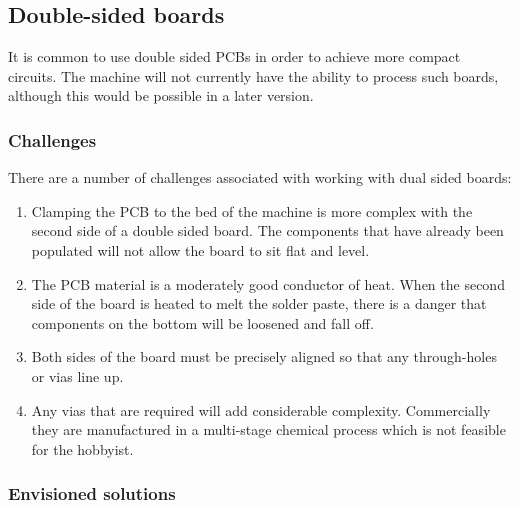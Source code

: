 \subsection{Double-sided boards}
It is common to use double sided PCBs in order to achieve more compact circuits. The machine will not currently have the ability to process such boards, although this would be possible in a later version.

\subsubsection{Challenges}
There are a number of challenges associated with working with dual sided boards:

\begin{enumerate}
	\item	Clamping the PCB to the bed of the machine is more complex with the second side of a double sided board. The components that have
			already been populated will not allow the board to sit flat and level.
	\item	The PCB material is a moderately good conductor of heat. When the second side of the board is heated to melt the solder paste, there
			is a danger that components on the bottom will be loosened and fall off.
	\item	Both sides of the board must be precisely aligned so that any through-holes or vias line up.
	\item	Any vias that are required will add considerable complexity. Commercially they are manufactured in a multi-stage chemical process
			which is not feasible for the hobbyist.
\end{enumerate}

\subsubsection{Envisioned solutions}

